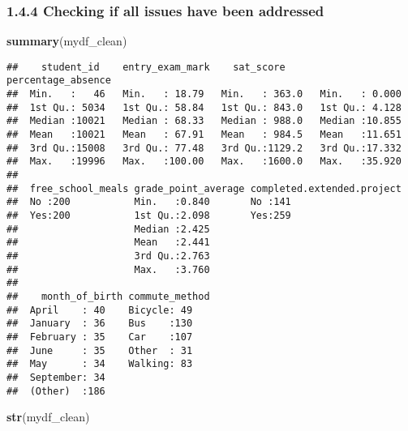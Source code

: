 \documentclass[
]{article}
\newenvironment{Shaded}{\begin{snugshade}}{\end{snugshade}}
\newcommand{\FunctionTok}[1]{\textcolor[rgb]{0.13,0.29,0.53}{\textbf{#1}}}
\newcommand{\NormalTok}[1]{#1}
\begin{document}
\subsubsection{1.4.4 Checking if all issues have been
addressed}\label{checking-if-all-issues-have-been-addressed}

\begin{Shaded}
\begin{Highlighting}[]
\FunctionTok{summary}\NormalTok{(mydf\_clean)}
\end{Highlighting}
\end{Shaded}

\begin{verbatim}
##    student_id    entry_exam_mark    sat_score      percentage_absence
##  Min.   :   46   Min.   : 18.79   Min.   : 363.0   Min.   : 0.000    
##  1st Qu.: 5034   1st Qu.: 58.84   1st Qu.: 843.0   1st Qu.: 4.128    
##  Median :10021   Median : 68.33   Median : 988.0   Median :10.855    
##  Mean   :10021   Mean   : 67.91   Mean   : 984.5   Mean   :11.651    
##  3rd Qu.:15008   3rd Qu.: 77.48   3rd Qu.:1129.2   3rd Qu.:17.332    
##  Max.   :19996   Max.   :100.00   Max.   :1600.0   Max.   :35.920    
##                                                                      
##  free_school_meals grade_point_average completed.extended.project
##  No :200           Min.   :0.840       No :141                   
##  Yes:200           1st Qu.:2.098       Yes:259                   
##                    Median :2.425                                 
##                    Mean   :2.441                                 
##                    3rd Qu.:2.763                                 
##                    Max.   :3.760                                 
##                                                                  
##    month_of_birth commute_method
##  April    : 40    Bicycle: 49   
##  January  : 36    Bus    :130   
##  February : 35    Car    :107   
##  June     : 35    Other  : 31   
##  May      : 34    Walking: 83   
##  September: 34                  
##  (Other)  :186
\end{verbatim}

\begin{Shaded}
\begin{Highlighting}[]
\FunctionTok{str}\NormalTok{(mydf\_clean)}
\end{Highlighting}
\end{Shaded}
\end{document}
